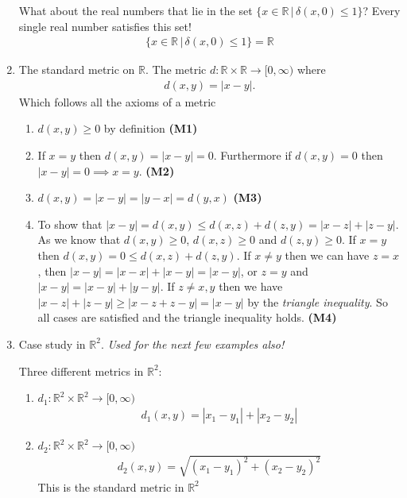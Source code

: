 \documentclass[10pt]{article}
\begin{document}
\begin{enumerate}
    What about the real numbers that lie in the set $\{x\in\mathbb{R}\,|\,\delta(x,0)\leq1\}$? Every single real number satisfies this set!
    \begin{align*}
        \{x\in\mathbb{R}\,|\,\delta(x,0)\leq1\}=\mathbb{R}
    \end{align*}

    \item The standard metric on $\mathbb{R}$. The metric $d:\mathbb{R}\times\mathbb{R}\to[0,\infty)$ where
    \begin{align*}
        d(x,y)=|x-y|.
    \end{align*}
    Which follows all the axioms of a metric
    \begin{enumerate}
        \item $d(x,y)\geq0$ by definition \textbf{(M1)}
        \item If $x=y$ then $d(x,y)=|x-y|=0$. Furthermore if $d(x,y)=0$ then $|x-y|=0\implies x=y$. \textbf{(M2)}
        \item $d(x,y)=|x-y|=|y-x|=d(y,x)$ \textbf{(M3)}
        \item To show that $|x-y|=d(x,y)\leq d(x,z)+d(z,y)=|x-z|+|z-y|$. As we know that $d(x,y)\geq0$, $d(x,z)\geq0$ and $d(z,y)\geq0$. If $x=y$ then $d(x,y)=0\leq d(x,z)+d(z,y)$. If $x\neq y$ then we can have $z=x$, then $|x-y|=|x-x|+|x-y|=|x-y|$, or $z=y$ and $|x-y|=|x-y|+|y-y|$. If $z\neq x, y$ then we have $|x-z|+|z-y|\geq|x-z+z-y|=|x-y|$ by the \emph{triangle inequality}. So all cases are satisfied and the triangle inequality holds. \textbf{(M4)}
    \end{enumerate}


    \item Case study in $\mathbb{R}^{2}$. \emph{Used for the next few examples also!}

    Three different metrics in $\mathbb{R}^{2}$:
    \begin{enumerate}
        \item $d_{1}:\mathbb{R}^{2}\times\mathbb{R}^{2}\to[0,\infty)$
        \begin{align*}
            d_{1}(x,y)=|x_{1}-y_{1}|+|x_{2}-y_{2}|
        \end{align*}
        \item $d_{2}:\mathbb{R}^{2}\times\mathbb{R}^{2}\to[0,\infty)$
        \begin{align*}
            d_{2}(x,y)=\sqrt{(x_{1}-y_{1})^{2}+(x_{2}-y_{2})^{2}}
        \end{align*}
        This is the standard metric in $\mathbb{R}^{2}$


\end{enumerate}
\end{enumerate}
\end{document}
